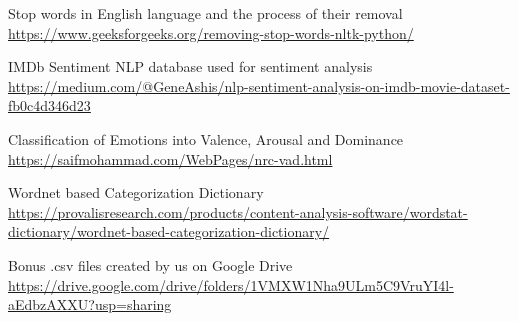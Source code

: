 \documentclass[openany]{article}
\begin{document}
\begin{thebibliography}{xx}

Stop words in English language and the process of their removal\\
\href{https://www.geeksforgeeks.org/removing-stop-words-nltk-python/}{https://www.geeksforgeeks.org/removing-stop-words-nltk-python/}

IMDb Sentiment NLP database used for sentiment analysis \\
\href{https://medium.com/@GeneAshis/nlp-sentiment-analysis-on-imdb-movie-dataset-fb0c4d346d23}{https://medium.com/@GeneAshis/nlp-sentiment-analysis-on-imdb-movie-dataset-fb0c4d346d23}

Classification of Emotions into Valence, Arousal and Dominance\\
\href{https://saifmohammad.com/WebPages/nrc-vad.html}{https://saifmohammad.com/WebPages/nrc-vad.html}

Wordnet based Categorization Dictionary\\
\href{https://provalisresearch.com/products/content-analysis-software/wordstat-dictionary/wordnet-based-categorization-dictionary/}{https://provalisresearch.com/products/content-analysis-software/wordstat-dictionary/wordnet-based-categorization-dictionary/}

Bonus .csv files created by us on Google Drive\\
\href{https://drive.google.com/drive/folders/1VMXW1Nha9ULm5C9VruYI4l-aEdbzAXXU?usp=sharing}{https://drive.google.com/drive/folders/1VMXW1Nha9ULm5C9VruYI4l-aEdbzAXXU?usp=sharing}

\end{thebibliography}
\end{document}
